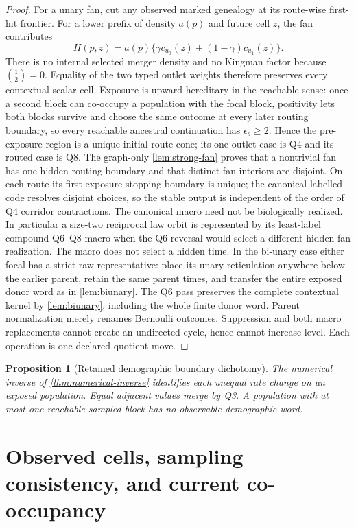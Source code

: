 \documentclass[11pt]{article}
\newtheorem{proposition}[theorem]{Proposition}
\begin{document}
\begin{proof}
For a unary fan, cut any observed marked genealogy at its route-wise first-hit
frontier.  For a lower prefix of density $a(p)$ and future cell $z$, the fan
contributes
\[
 H(p,z)=a(p)\{\gamma c_{u_0}(z)+(1-\gamma)c_{u_1}(z)\}.
\]
There is no internal selected merger density and no Kingman factor because
$\binom12=0$.  Equality of the two typed outlet weights therefore preserves
every contextual scalar cell.  Exposure is upward hereditary in the reachable
sense: once a second block can co-occupy a population with the focal block,
positivity lets both blocks survive and choose the same outcome at every later
routing boundary, so every reachable ancestral continuation has
$\epsilon_s\ge2$.  Hence the pre-exposure region is a unique initial route
cone; its one-outlet case is Q4 and its routed case is Q8.  The graph-only \cref{lem:strong-fan} proves that a
nontrivial fan has one hidden routing boundary and that distinct fan interiors
are disjoint.  On each route its first-exposure stopping boundary is unique;
the canonical labelled code resolves disjoint choices, so the stable output is
independent of the order of Q4 corridor contractions.  The canonical macro
need not be biologically realized.  In particular a size-two reciprocal law
orbit is represented by its least-label compound Q6--Q8 macro when the Q6
reversal would select a different hidden fan realization.  The macro does not
select a hidden time.  In the bi-unary case either focal has a strict raw
representative: place its unary reticulation anywhere below the earlier
parent, retain the same parent times, and transfer the entire exposed donor
word as in \cref{lem:biunary}.  The Q6 pass preserves the complete contextual
kernel by \cref{lem:biunary}, including the whole finite donor word.  Parent
normalization merely renames Bernoulli outcomes.  Suppression and both macro
replacements cannot create an undirected cycle, hence cannot increase level.
Each operation is one declared quotient move.
\end{proof}

\begin{proposition}[Retained demographic boundary dichotomy]
\label{prop:boundary}
The numerical inverse of \cref{thm:numerical-inverse} identifies each unequal
rate change on an exposed population.  Equal adjacent values merge by Q3.
A population with at most one reachable sampled block has no observable
demographic word.
\end{proposition}

\section{Observed cells, sampling consistency, and current co-occupancy}
\label{sec:bridge}
\label{sec:routing}
\end{document}
